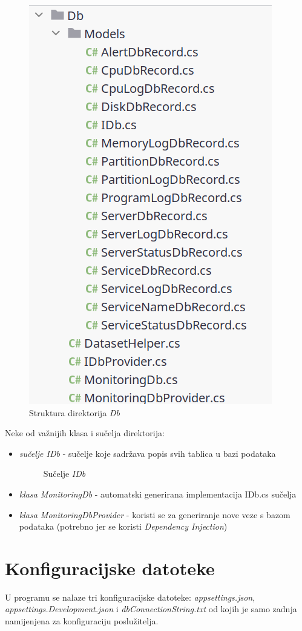 \documentclass[zavrsnirad]{fer}
\begin{document}
\begin{figure}[htb!]
	\centering
	\includegraphics[width=0.5\linewidth]{images/db_dir_structure.png} 
	\caption{Struktura direktorija \textit{Db}}
	\label{slk:db_dir_structure}
\end{figure}
\FloatBarrier

Neke od važnijih klasa i sučelja direktorija:
\begin{itemize}
	\item \textit{sučelje IDb} - sučelje koje sadržava popis svih tablica u bazi podataka
	\begin{figure}[htb]
		\centering
		
		\caption{Sučelje \textit{IDb}}
	\end{figure}
	\FloatBarrier
	\item \textit{klasa MonitoringDb} - automatski generirana implementacija IDb.cs sučelja
	\item \textit{klasa MonitoringDbProvider} - koristi se za generiranje nove veze s bazom podataka (potrebno jer se koristi \textit{Dependency Injection})
\end{itemize}

\section{Konfiguracijske datoteke}
U programu se nalaze tri konfiguracijske datoteke: \textit{appsettings.json}, \textit{appsettings.Development.json} i \textit{dbConnectionString.txt} od kojih je samo zadnja namijenjena za konfiguraciju poslužitelja.
\end{document}
